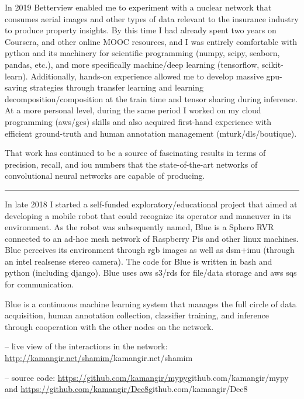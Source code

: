 \osspacing
In 2019 Betterview enabled me to experiment with a nuclear network that consumes aerial images and other types of data relevant to the insurance industry to produce property insights. By this time I had already spent two years on Coursera, and other online MOOC resources, and I was entirely comfortable with python and its machinery for scientific programming (numpy, scipy, seaborn, pandas, etc.), and more specifically machine/deep learning (tensorflow, scikit-learn). Additionally, hands-on experience allowed me to develop massive gpu-saving strategies through transfer learning and learning decomposition/composition at the train time and tensor sharing during inference. At a more personal level, during the same period I worked on my cloud programming (aws/gcs) skills and also acquired first-hand experience with efficient ground-truth and human annotation management (mturk/dls/boutique). 

\osspacing
That work has continued to be a source of fascinating results in terms of precision, recall, and iou numbers that the state-of-the-art networks of convolutional neural networks are capable of producing.

\noindent\rule{8cm}{0.4pt}

\osspacing
In late 2018 I started a self-funded exploratory/educational project that aimed at developing a mobile robot that could recognize its operator and maneuver in its environment. As the robot was subsequently named, Blue is a Sphero RVR connected to an ad-hoc mesh network of Raspberry Pis and other linux machines. Blue perceives its environment through rgb images as well as dsm+imu (through an intel realsense stereo camera). The code for Blue is written in bash and python (including django). Blue uses aws s3/rds for file/data storage and aws sqs for communication. 

\osspacing
Blue is a continuous machine learning system that manages the full circle of data acquisition, human annotation collection, classifier training, and inference through cooperation with the other nodes on the network. 

-- live view of the interactions in the network: \url{http://kamangir.net/shamim/}{kamangir.net/shamim} 

-- source code: \url{https://github.com/kamangir/mypy}{github.com/kamangir/mypy} and \url{https://github.com/kamangir/Dec8}{github.com/kamangir/Dec8}

